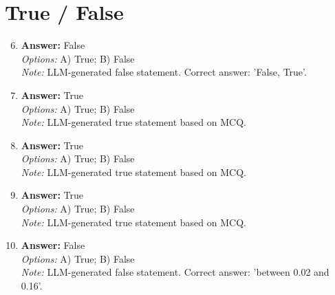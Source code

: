 \documentclass[12pt]{article}
\begin{document}
\section*{True / False}
\begin{enumerate}[label=\arabic*.]
\setcounter{enumi}{5}
\item \textbf{Answer:} False
\\ \textit{Options:} A) True; B) False
\\ \textit{Note:} LLM-generated false statement. Correct answer: 'False, True'.
\item \textbf{Answer:} True
\\ \textit{Options:} A) True; B) False
\\ \textit{Note:} LLM-generated true statement based on MCQ.
\item \textbf{Answer:} True
\\ \textit{Options:} A) True; B) False
\\ \textit{Note:} LLM-generated true statement based on MCQ.
\item \textbf{Answer:} True
\\ \textit{Options:} A) True; B) False
\\ \textit{Note:} LLM-generated true statement based on MCQ.
\item \textbf{Answer:} False
\\ \textit{Options:} A) True; B) False
\\ \textit{Note:} LLM-generated false statement. Correct answer: 'between 0.02 and 0.16'.
\end{enumerate}
\end{document}
